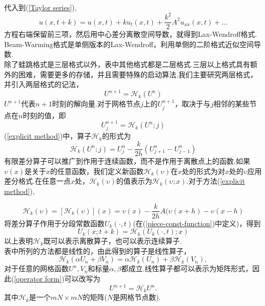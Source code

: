 代入到(\ref{Taylor series}),
\begin{equation}
	u(x,t+k) = u(x,t) +  ku_t(x,t) + \frac{k^2}{2}A^2u_{xx}(x,t) + \ldots 	
\end{equation}
方程右端保留前三项，然后用中心差分离散空间导数，就得到Lax-Wendroff格式.\\
Beam-Warming格式是单侧版本的Lax-Wendroff，利用单侧的二阶格式近似空间导数.\\
除了蛙跳格式是三层格式以外，表中其他格式都是二层格式.三层以上格式具有额外的困难，需要更多的存储，并且需要特殊的启动算法.我们主要研究两层格式，并引入两层格式的记法，
\begin{equation} \label{operator form}
	U^{n+1} = \mathcal{H}_k(U^n)
\end{equation}
$U^{n+1}$代表$n+1$时刻的解向量.对于网格节点$j$上的$U_j^{n+1}$，取决于与$j$相邻的某些节点在$n$时刻的值，即
\begin{equation}
	U_j^{n+1} =  \mathcal{H}_k(U^n;j)
\end{equation}
(\ref{explicit method})中，算子$\mathcal{H}_k$的形式为
\begin{equation}
	\mathcal{H}_k(U^n;j) = U_{j}^n - \frac{k}{2h}(U_{j+1}^{n} - U_{j-1}^{n})
\end{equation}
有限差分算子可以推广到作用于连续函数，而不是作用于离散点上的函数.如果$\upsilon(x)$是关于$x$的任意函数，我们定义新函数$\mathcal{H}_k(\upsilon)$在$x$处的形式为对$x$处的$\upsilon$应用差分格式.在任意一点$x$处，$\mathcal{H}_k(\upsilon)$的值表示为$\mathcal{H}_k(\upsilon;x)$.对于方法(\ref{explicit method}),

\begin{equation}
	\mathcal{H}_k(\upsilon) = [\mathcal{H}_k(\upsilon)](x) = \upsilon(x)- \frac{k}{2h}A(\upsilon(x+h)-\upsilon(x-h)
\end{equation}
将差分算子作用于分段常数函数$U_k(\cdot,t)$(在(\ref{piece-const-function})中定义)，得到
\begin{equation}
	U_k(x;t+k) = \mathcal{H}_k(U_k(\cdot,t);x)
\end{equation}
以上表明$\mathcal{H}_k$既可以表示离散算子，也可以表示连续算子.\\
表中所列的方法都是线性的，由此得到的算子是线性算子，
\begin{equation}
	\mathcal{H}_k(\alpha U_n + \beta V_n) = \alpha \mathcal{H}_k(U_n) + \beta \mathcal{H}_k(V_n),
\end{equation}
对于任意的网格函数$U^n,V_n$和标量$\alpha,\beta$都成立.线性算子都可以表示为矩阵形式，因此(\ref{operator form})可以改写为
\begin{equation}
	U^{n+1} = \mathcal{H}_k U^n.
\end{equation}
其中$\mathcal{H}_k$是一个$mN \times mN$的矩阵($N$是网格节点数).

